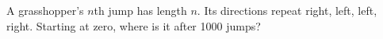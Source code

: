 A grasshopper's $n$th jump has length $n$. Its directions repeat right, left, left, right. Starting at zero, where is it after 1000 jumps?
